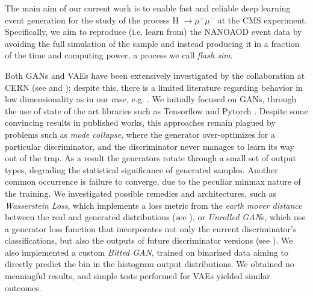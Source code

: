 \documentclass{scrartcl} %
\begin{document}
	The main aim of our current work is to enable fast and reliable  deep learning event generation for the study of the process H $\xrightarrow{} \mu^+ \mu^-$ at the CMS experiment. Specifically, we aim to reproduce (i.e. learn from) the NANOAOD event data \cite{2019EPJWC.21406021R} by avoiding the full simulation of the sample and instead producing it in a fraction of the time and computing power, a process we call \emph{flash sim}.
	
	Both GANs and VAEs have been extensively investigated by the collaboration at CERN (see \cite{2019glhc} and \cite{otten2021event}); despite this, there is a limited literature regarding behavior in low dimensionality as in our case, e.g. \cite{523096}. We initially focused on GANs, through the use of state of the art libraries such as Tensorflow \cite{tensorflow2015-whitepaper} and Pytorch \cite{NEURIPS2019_9015}. Despite some convincing results in published works, this approaches remain plagued by problems such as \emph{mode collapse}, where the generator over-optimizes for a particular discriminator, and the discriminator never manages to learn its way out of the trap. As a result the generators rotate through a small set of output types, degrading the statistical significance of generated samples. Another common occurrence is failure to converge, due to the peculiar minmax nature of the training.
	We investigated possible remedies and architectures, such as \emph{Wasserstein Loss}, which implements a loss metric from the \emph{earth mover distance} between the real and generated distributions (see \cite{arjovsky2017wasserstein}), or \emph{Unrolled GAN}s, which use a generator loss function that incorporates not only the current discriminator's classifications, but also the outputs of future discriminator versions (see \cite{metz2017unrolled}). We also implemented a custom \emph{Bitted GAN}, trained on binarized data aiming to directly predict the bin in the histogram output distributions.
	We obtained no meaningful results, and simple tests performed for VAEs yielded similar outcomes.
	
\end{document}
